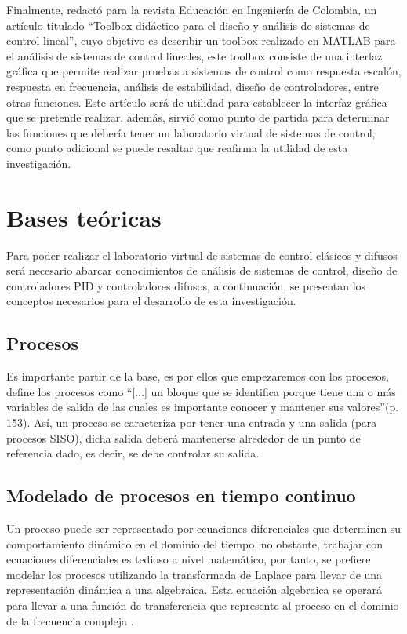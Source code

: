	Finalmente, \textcite{cadavid2009toolbox} redactó para la revista Educación en Ingeniería de Colombia, un artículo titulado \enquote{Toolbox didáctico para el diseño y análisis de sistemas de control lineal}, cuyo objetivo es describir un toolbox realizado en MATLAB para el análisis de sistemas de control lineales, este toolbox consiste de una interfaz gráfica que permite realizar pruebas a sistemas de control como respuesta escalón, respuesta en frecuencia, análisis de estabilidad, diseño de controladores, entre otras funciones. Este artículo será de utilidad para establecer la interfaz gráfica que se pretende realizar, además, sirvió como punto de partida para determinar las funciones que debería tener un laboratorio virtual de sistemas de control, como punto adicional se puede resaltar que reafirma la utilidad de esta investigación. 
	
\section{Bases teóricas}
	
	Para poder realizar el laboratorio virtual de sistemas de control clásicos y difusos será necesario abarcar conocimientos de análisis de sistemas de control, diseño de controladores PID y controladores difusos, a continuación, se presentan los conceptos necesarios para el desarrollo de esta investigación.
	
	\subsection{Procesos}
		
		Es importante partir de la base, es por ellos que empezaremos con los procesos, \textcite{sanchez2003control} define los procesos como \enquote{[...] un bloque que se identifica porque tiene una o más variables de salida de las cuales es importante conocer y mantener sus valores}(p.$\,$153). Así, un proceso se caracteriza por tener una entrada y una salida (para procesos SISO), dicha salida deberá mantenerse alrededor de un punto de referencia dado, es decir, se debe controlar su salida.
	
	\subsection{Modelado de procesos en tiempo continuo}
	
		Un proceso puede ser representado por ecuaciones diferenciales que determinen su comportamiento dinámico en el dominio del tiempo, no obstante, trabajar con ecuaciones diferenciales es tedioso a nivel matemático, por tanto, se prefiere modelar los procesos utilizando la transformada de Laplace para llevar de una representación dinámica a una algebraica. Esta ecuación algebraica se operará para llevar a una función de transferencia que represente al proceso en el dominio de la frecuencia compleja \Parencite{smith1985principles}.
	
